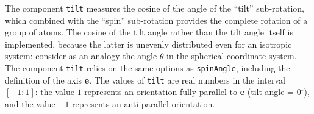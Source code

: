 The component \texttt{tilt} measures the cosine of the angle of the ``tilt'' sub-rotation, which combined with the ``spin'' sub-rotation provides the complete rotation of a group of atoms.
The cosine of the tilt angle rather than the tilt angle itself is implemented, because the latter is unevenly distributed even for an isotropic system: consider as an analogy the angle $\theta$ in the spherical coordinate system.
The component \texttt{tilt} relies on the same options as \texttt{spinAngle}, including the definition of the axis \textbf{e}.
The values of \texttt{tilt} are real numbers in the interval $[-1:1]$: the value $1$ represents an orientation fully parallel to \textbf{e} (tilt angle = 0$^\circ$), and the value $-1$ represents an anti-parallel orientation.


